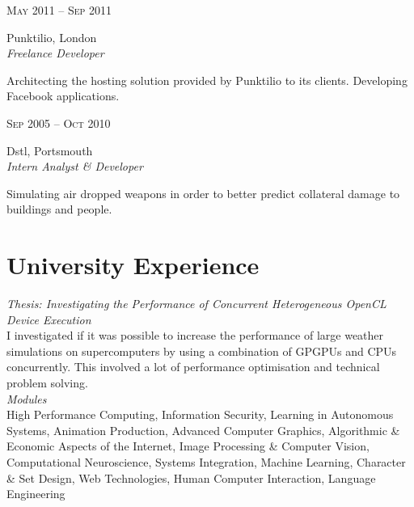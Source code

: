 \documentclass[10pt]{article}
\begin{document}
{\begin{minipage}[t]{0.5\textwidth}
{\raggedleft\textsc{May 2011 -- Sep 2011}\par}

{\raggedright\large Punktilio, London\\
\textit{Freelance Developer}\\[5pt]}

\normalsize{
Architecting the hosting solution provided by Punktilio to its clients. Developing Facebook applications.}\\

{\raggedleft\textsc{Sep 2005 -- Oct 2010}\par}

{\raggedright\large Dstl, Portsmouth\\
\textit{Intern Analyst \& Developer}\\[5pt]}

\normalsize{Simulating air dropped weapons in order to better predict collateral damage to buildings and people.}\\

\section{University Experience}
{\textit{Thesis: Investigating the Performance of Concurrent Heterogeneous OpenCL Device Execution}}\\
\normalsize{I investigated if it was possible to increase the performance of large weather simulations on supercomputers by using a combination of GPGPUs and CPUs concurrently. This involved a lot of performance optimisation and technical problem solving.}\\

{\textit{Modules}}\\
\normalsize{High Performance Computing, Information Security, Learning in Autonomous Systems, Animation Production, Advanced Computer Graphics, Algorithmic \& Economic Aspects of the Internet, Image Processing \& Computer Vision, Computational Neuroscience, Systems Integration, Machine Learning, Character \& Set Design, Web Technologies, Human Computer Interaction, Language Engineering}

\end{minipage} %
\hfill
\begin{minipage}[t]{0.44\textwidth} 
\vspace{0pt} %



\end{minipage}}
\end{document}
